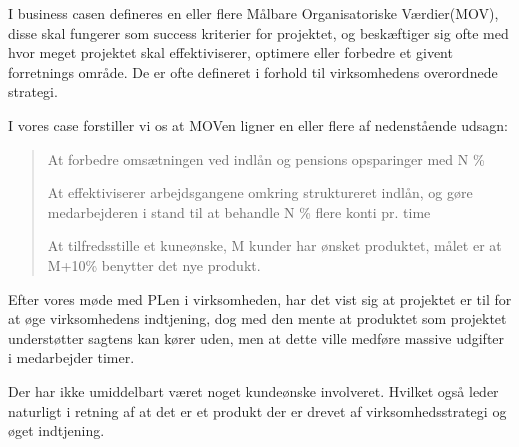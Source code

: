 I business casen defineres en eller flere Målbare Organisatoriske Værdier(MOV),
disse skal fungerer som success kriterier for projektet, og beskæftiger sig
ofte med hvor meget projektet skal effektiviserer, optimere eller forbedre et
givent forretnings område. De er ofte defineret i forhold til virksomhedens
overordnede strategi.

I vores case forstiller vi os at MOVen ligner en eller flere af nedenstående
udsagn:

\begin{quote}
At forbedre omsætningen ved indlån og pensions opsparinger med N \%

At effektiviserer arbejdsgangene omkring struktureret indlån, og gøre
medarbejderen i stand til at behandle N \% flere konti pr. time

At tilfredsstille et kuneønske, M kunder har ønsket produktet, målet er at
M+10\% benytter det nye produkt.
\end{quote}

Efter vores møde med PLen i virksomheden, har det vist sig at projektet er til
for at øge virksomhedens indtjening, dog med den mente at produktet som
projektet understøtter sagtens kan kører uden, men at dette ville medføre
massive udgifter i medarbejder timer.

Der har ikke umiddelbart været noget kundeønske involveret. Hvilket også leder
naturligt i retning af at det er et produkt der er drevet af virksomhedsstrategi
og øget indtjening.
